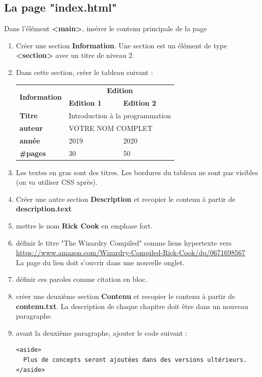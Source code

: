 \documentclass[11pt, a4paper]{article}
\begin{document}
\subsection*{La page "index.html"}

Dans l'élément \textbf{<main>}, insérer le contenu principale de la page  
\begin{enumerate}
	\item Créer une section \textbf{Information}. Une section est un élément de type \textbf{<section>} avec un titre de niveau 2.
	\item Dans cette section, créer le tableau suivant : 
	\begin{tabular}{|l|l|l|}
		\hline
		\multirow{2}{*}{\textbf{Information}} & \multicolumn{2}{c|}{\textbf{Edition}} \\
		\cline{2-3}
		& \textbf{Edition 1} & \textbf{Edition 2} \\
		\hline
		\textbf{Titre} & \multicolumn{2}{l|}{Introduction à la programmation} \\
		\hline
		\textbf{auteur} & \multicolumn{2}{l|}{VOTRE NOM COMPLET} \\
		\hline
		\textbf{année} & 2019 & 2020 \\
		\hline
		\textbf{\#pages} & 30 & 50 \\
		\hline
	\end{tabular}
	\item Les textes en gras sont des titres. Les bordures du tableau ne sont pas visibles (on va utiliser CSS après).
	\item Créer une autre section \textbf{Description} et recopier le contenu à partir de \textbf{description.text}
	\item mettre le nom \textbf{Rick Cook} en emphase fort. 
	\item définir le titre "The Wizardry Compiled" comme liens hypertexte vers \\ \url{https://www.amazon.com/Wizardry-Compiled-Rick-Cook/dp/0671698567}\\
	La page du lien doit s'ouvrir dans une nouvelle onglet. 
	\item définir ces paroles comme citation en bloc.
	\item créer une deuxième section \textbf{Contenu} et recopier le contenu à partir de \textbf{contenu.txt}. 
	La description de chaque chapitre doit être dans un nouveau paragraphe.
	\item avant la deuxième paragraphe, ajouter le code suivant : 
\begin{verbatim}
<aside>
  Plus de concepts seront ajoutées dans des versions ultérieurs.
</aside>
\end{verbatim}
	
\end{enumerate}
\end{document}
